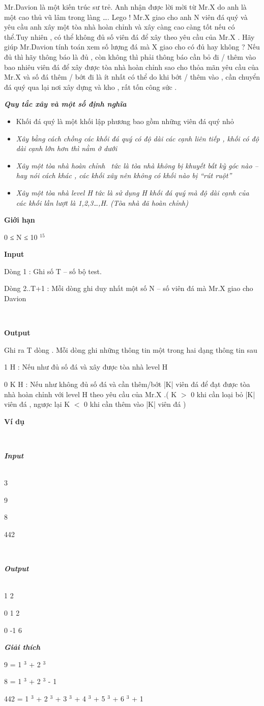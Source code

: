 

Mr.Davion là một kiến trúc sư trẻ. Anh nhận được lời mời từ Mr.X do anh là một cao thủ vũ lâm trong làng …. Lego ! Mr.X giao cho anh N viên đá quý và yêu cầu anh xây một tòa nhà hoàn chỉnh và xây càng cao càng tốt nếu có thể.Tuy nhiên , có thể không đủ số viên đá để xây theo yêu cầu của Mr.X . Hãy giúp Mr.Davion tính toán xem số lượng đá mà X giao cho có đủ hay không ? Nếu đủ thì hãy thông báo là đủ , còn không thì phải thông báo cần bỏ đi / thêm vào bao nhiêu viên đá để xây được tòa nhà hoàn chỉnh sao cho thỏa mãn yêu cầu của Mr.X và số đá thêm / bớt đi là ít nhất có thể do khi bớt / thêm vào , cần chuyển đá quý qua lại nơi xây dựng và kho , rất tốn công sức .

\textbf{\emph{Quy tắc xây và một số định nghĩa }}
\begin{itemize}
	\item Khối đá quý là một khối lập phương bao gồm những viên đá quý nhỏ \emph{}
	\item \emph{Xây bằng cách chồng các khối đá quý có độ dài các cạnh liên tiếp , khối có độ dài cạnh lớn hơn thì nằm ở dưới}
	\item \emph{Xây một tòa nhà hoàn chỉnh  tức là tòa nhà không bị khuyết bất kỳ góc nào – hay nói cách khác , các khối xây nên không có khối nào bị “rút ruột”}
	\item \emph{Xây một tòa nhà level H tức là sử dụng H khối đá quý mà độ dài cạnh của các khối lần lượt là 1,2,3…,H. (Tòa nhà đã hoàn chỉnh)}
\end{itemize}

\textbf{Giới hạn }

0 ≤ N ≤ 10 $^ 15 $

\textbf{Input }

Dòng 1 : Ghi số T – số bộ test.

Dòng 2..T+1 : Mỗi dòng ghi duy nhất một số N – số viên đá mà Mr.X giao cho Davion

 

\textbf{Output }

Ghi ra T dòng . Mỗi dòng ghi những thông tin một trong hai dạng thông tin sau

1 H : Nếu như đủ số đá và xây được tòa nhà level H

0 K H : Nếu như không đủ số đá và cần thêm/bớt |K| viên đá để đạt được tòa nhà hoàn chỉnh với level H theo yêu cầu của Mr.X .( K $>$ 0 khi cần loại bỏ |K| viên đá , ngược lại K $<$ 0 khi cần thêm vào |K| viên đá )

\textbf{Ví dụ }

 

\textbf{\emph{Input }}
\\ 

3

9

8

442

 

\textbf{\emph{Output }}
\\ 

1 2

0 1 2

0 -1 6

\emph{\textbf{Giải thích }}

9 = 1 $^ 3 $ + 2 $^ 3 $

8 = 1 $^ 3 $ + 2 $^ 3 $ - 1

442 = 1 $^ 3 $ + 2 $^ 3 $ + 3 $^ 3 $ + 4 $^ 3 $ + 5 $^ 3 $ + 6 $^ 3 $ + 1